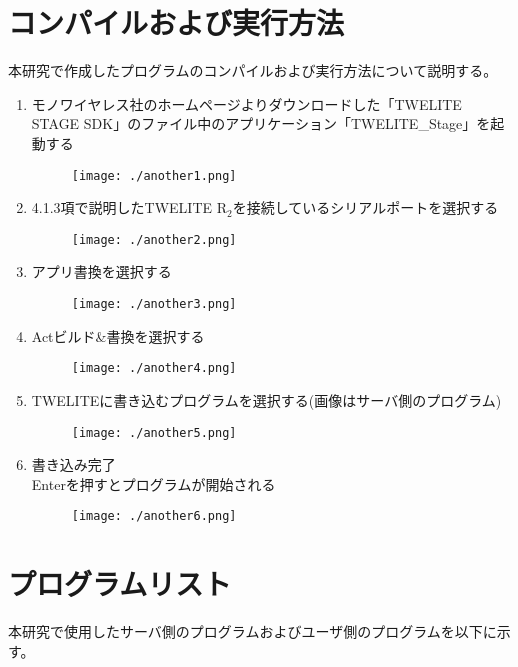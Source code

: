 \documentclass{thesis}
\begin{document}
\chapter{コンパイルおよび実行方法}
本研究で作成したプログラムのコンパイルおよび実行方法について説明する。
\begin{enumerate}
\item モノワイヤレス社のホームページよりダウンロードした「TWELITE STAGE SDK」のファイル中のアプリケーション「TWELITE\_Stage」を起動する
\begin{figure}[H]
 \center
 \texttt{[image: ./another1.png]}
\end{figure}

\item 4.1.3項で説明したTWELITE R$_2$を接続しているシリアルポートを選択する
\begin{figure}[H]
 \center
 \texttt{[image: ./another2.png]}
\end{figure}

\item アプリ書換を選択する
\begin{figure}[H]
 \center
 \texttt{[image: ./another3.png]}
\end{figure}

\item Actビルド\&書換を選択する
\begin{figure}[H]
 \center
 \texttt{[image: ./another4.png]}
\end{figure}

\item TWELITEに書き込むプログラムを選択する(画像はサーバ側のプログラム)
\begin{figure}[H]
 \center
 \texttt{[image: ./another5.png]}
\end{figure}

\item 書き込み完了 \\
Enterを押すとプログラムが開始される
\begin{figure}[H]
 \center
 \texttt{[image: ./another6.png]}
\end{figure}
\end{enumerate}

\chapter{プログラムリスト}
\quad 本研究で使用したサーバ側のプログラムおよびユーザ側のプログラムを以下に示す。
\end{document}
